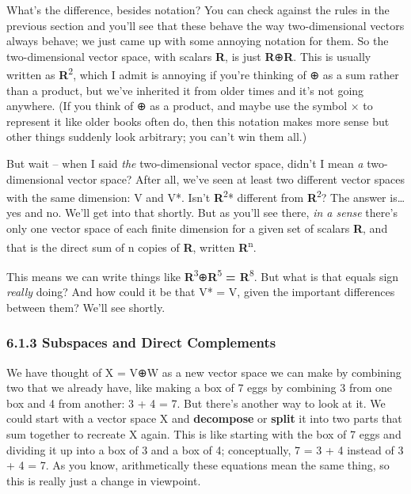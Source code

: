 \documentclass[oneside,english]{amsbook}
\numberwithin{section}{chapter}
\theoremstyle{plain}
\theoremstyle{definition}
\begin{document}
What's the difference, besides notation? You can check against the rules
in the previous section and you'll see that these behave the way
two-dimensional vectors always behave; we just came up with some
annoying notation for them. So the two-dimensional vector space, with
scalars \textbf{R}, is just \textbf{R}⊕\textbf{R}. This is usually
written as \textbf{R}\textsuperscript{2}, which I admit is annoying if
you're thinking of ⊕ as a sum rather than a product, but we've inherited
it from older times and it's not going anywhere. (If you think of ⊕ as a
product, and maybe use the symbol × to represent it like older books
often do, then this notation makes more sense but other things suddenly
look arbitrary; you can't win them all.)

But wait -- when I said \emph{the} two-dimensional vector space, didn't
I mean \emph{a} two-dimensional vector space? After all, we've seen at
least two different vector spaces with the same dimension: V and V*.
Isn't \textbf{R}\textsuperscript{2}* different from
\textbf{R}\textsuperscript{2}? The answer is\ldots{} yes and no. We'll
get into that shortly. But as you'll see there, \emph{in a sense}
there's only one vector space of each finite dimension for a given set
of scalars \textbf{R}, and that is the direct sum of n copies of
\textbf{R}, written \textbf{R}\textsuperscript{n}.

This means we can write things like
\textbf{R}\textsuperscript{3}⊕\textbf{R}\textsuperscript{5} \textbf{=
	R}\textsuperscript{8}. But what is that equals sign \emph{really} doing?
And how could it be that V* = V, given the important differences between
them? We'll see shortly.

\subsubsection{6.1.3 Subspaces and Direct
	Complements}\label{subspaces-and-direct-complements}

We have thought of X = V⊕W as a new vector space we can make by
combining two that we already have, like making a box of 7 eggs by
combining 3 from one box and 4 from another: 3 + 4 = 7. But there's
another way to look at it. We could start with a vector space X and
\textbf{decompose} or \textbf{split} it into two parts that sum together
to recreate X again. This is like starting with the box of 7 eggs and
dividing it up into a box of 3 and a box of 4; conceptually, 7 = 3 + 4
instead of 3 + 4 = 7. As you know, arithmetically these equations mean
the same thing, so this is really just a change in viewpoint.
\end{document}
